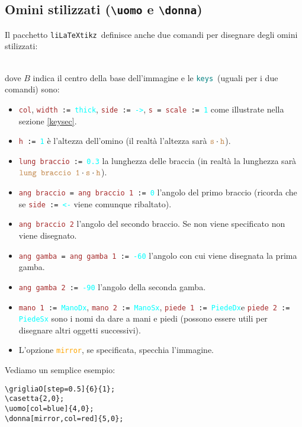 \documentclass[italian, a4paper]{article}
\newcommand{\bs}{\textbackslash}
\newcommand{\ttt}[1]{\texttt{#1}}
\newcommand{\liLaTeXtikz}{\ttt{liLaTeXtikz}}
\newcommand{\comandons}[2][\large]{\vspace*{1mm}\noindent\fbox{\parbox{\textwidth}{#1\ttt{#2}}}}
\newcommand{\comando}[2][\large]{\comandons[#1]{#2}\vspace*{3mm}}
\newcommand{\blue}[1]{\textcolor{blue}{#1}}
\newcommand{\cyan}[1]{\textcolor{cyan}{#1}}
\newcommand{\keys}{\textcolor{teal}{\ttt{keys}}}
\newcommand{\key}[1]{\textcolor{brown}{\ttt{#1}}}
\newcommand{\keyop}[1]{\textcolor{orange}{\ttt{#1}}}
\newcommand{\keyval}[1]{\cyan{\ttt{#1}}}
\begin{document}
\subsection{Omini stilizzati (\ttt{\bs uomo} e \ttt{\bs donna})}
Il pacchetto \liLaTeXtikz\ definisce anche due comandi per disegnare degli omini stilizzati:

\comando{\bs uomo[\keys]\{\blue{$B$}\};}\\
\comandons{\bs donna[\keys]\{\blue{$B$}\};}
dove $B$ indica il centro della base dell'immagine e le \keys\ (uguali per i due comandi) sono:
\begin{itemize}[nolistsep]
\item \key{col}, \ttt{\key{width} := \keyval{thick}}, \ttt{\key{side} := \keyval{->}}, \ttt{\key{s} = \key{scale} := \keyval{1}} come illustrate nella sezione \ref{keysec}.
\item \ttt{\key{h} := \keyval{1}} è l'altezza dell'omino (il realtà l'altezza sarà $\key{s}\cdot\key{h}$).
\item \ttt{\key{lung braccio} := \keyval{0.3}} la lunghezza delle braccia (in realtà la lunghezza sarà $\key{lung braccio 1}\cdot\key{s}\cdot\key{h}$).
\item \ttt{\key{ang braccio} = \key{ang braccio 1} := \keyval{0}} l'angolo del primo braccio (ricorda che se \ttt{\key{side} := \keyval{<-}} viene comunque ribaltato).
\item \key{ang braccio 2} l'angolo del secondo braccio. Se non viene specificato non viene disegnato.
\item \ttt{\key{ang gamba} = \key{ang gamba 1} := \keyval{-60}} l'angolo con cui viene disegnata la prima gamba.
\item \ttt{\key{ang gamba 2} := \keyval{-90}} l'angolo della seconda gamba.
\item \ttt{\key{mano 1} := \keyval{ManoDx}}, \ttt{\key{mano 2} := \keyval{ManoSx}}, \ttt{\key{piede 1} := \keyval{PiedeDx}}e  \ttt{\key{piede 2} := \keyval{PiedeSx}} sono i nomi da dare a mani e piedi (possono essere utili per disegnare altri oggetti successivi).
\item L'opzione \keyop{mirror}, se specificata, specchia l'immagine.
\end{itemize}

Vediamo un semplice esempio:

\begin{Verbatim}[frame=single]
\grigliaO[step=0.5]{6}{1};
\casetta{2,0};
\uomo[col=blue]{4,0};
\donna[mirror,col=red]{5,0};
\end{Verbatim}
\vspace*{-4mm}
\end{document}
